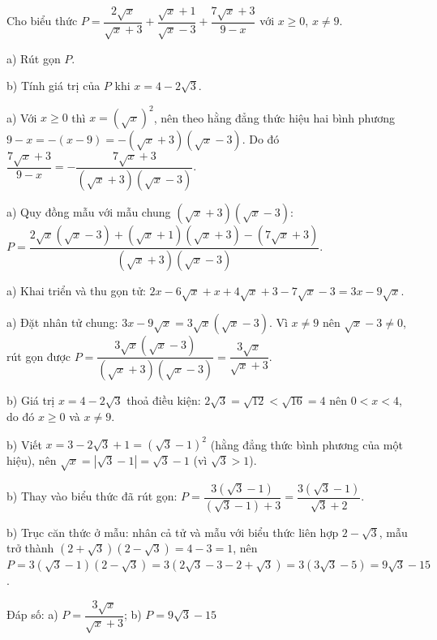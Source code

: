 \begin{problem}[9DS-CAN-007]
Cho biểu thức $P = \dfrac{2\sqrt{x}}{\sqrt{x} + 3} + \dfrac{\sqrt{x} + 1}{\sqrt{x} - 3} + \dfrac{7\sqrt{x} + 3}{9 - x}$ với $x \geq 0$, $x \neq 9$.

a) Rút gọn $P$.

b) Tính giá trị của $P$ khi $x = 4 - 2\sqrt{3}$.

\begin{solution}
a) Với $x \geq 0$ thì $x = (\sqrt{x})^2$, nên theo hằng đẳng thức hiệu hai bình phương $9 - x = -(x - 9) = -(\sqrt{x} + 3)(\sqrt{x} - 3)$. Do đó $\dfrac{7\sqrt{x} + 3}{9 - x} = -\dfrac{7\sqrt{x} + 3}{(\sqrt{x} + 3)(\sqrt{x} - 3)}$.

a) Quy đồng mẫu với mẫu chung $(\sqrt{x} + 3)(\sqrt{x} - 3)$: $P = \dfrac{2\sqrt{x}(\sqrt{x} - 3) + (\sqrt{x} + 1)(\sqrt{x} + 3) - (7\sqrt{x} + 3)}{(\sqrt{x} + 3)(\sqrt{x} - 3)}$.

a) Khai triển và thu gọn tử: $2x - 6\sqrt{x} + x + 4\sqrt{x} + 3 - 7\sqrt{x} - 3 = 3x - 9\sqrt{x}$.

a) Đặt nhân tử chung: $3x - 9\sqrt{x} = 3\sqrt{x}(\sqrt{x} - 3)$. Vì $x \neq 9$ nên $\sqrt{x} - 3 \neq 0$, rút gọn được $P = \dfrac{3\sqrt{x}(\sqrt{x} - 3)}{(\sqrt{x} + 3)(\sqrt{x} - 3)} = \dfrac{3\sqrt{x}}{\sqrt{x} + 3}$.

b) Giá trị $x = 4 - 2\sqrt{3}$ thoả điều kiện: $2\sqrt{3} = \sqrt{12} < \sqrt{16} = 4$ nên $0 < x < 4$, do đó $x \geq 0$ và $x \neq 9$.

b) Viết $x = 3 - 2\sqrt{3} + 1 = (\sqrt{3} - 1)^2$ (hằng đẳng thức bình phương của một hiệu), nên $\sqrt{x} = |\sqrt{3} - 1| = \sqrt{3} - 1$ (vì $\sqrt{3} > 1$).

b) Thay vào biểu thức đã rút gọn: $P = \dfrac{3(\sqrt{3} - 1)}{(\sqrt{3} - 1) + 3} = \dfrac{3(\sqrt{3} - 1)}{\sqrt{3} + 2}$.

b) Trục căn thức ở mẫu: nhân cả tử và mẫu với biểu thức liên hợp $2 - \sqrt{3}$, mẫu trở thành $(2 + \sqrt{3})(2 - \sqrt{3}) = 4 - 3 = 1$, nên $P = 3(\sqrt{3} - 1)(2 - \sqrt{3}) = 3(2\sqrt{3} - 3 - 2 + \sqrt{3}) = 3(3\sqrt{3} - 5) = 9\sqrt{3} - 15$.

Đáp số: a) $\boxed{P = \dfrac{3\sqrt{x}}{\sqrt{x} + 3}}$; b) $\boxed{P = 9\sqrt{3} - 15}$
\end{solution}
\end{problem}

